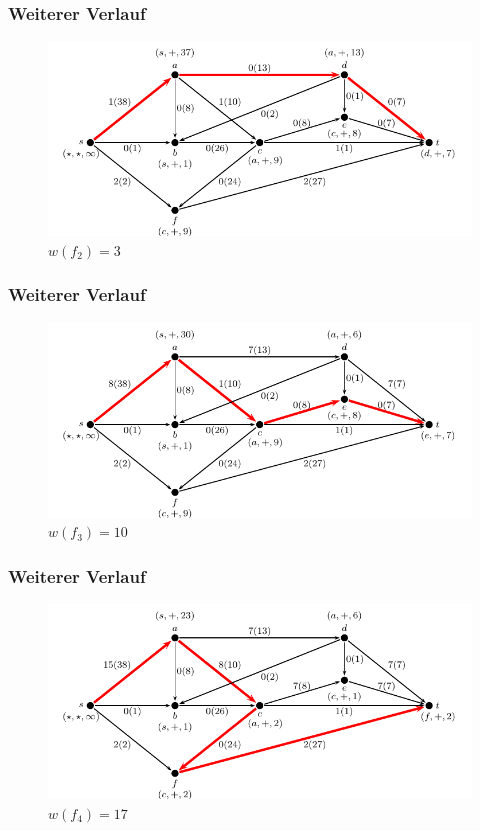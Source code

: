 \documentclass[smaller]{beamer}
\begin{document}
\begin{frame}
 \frametitle{Weiterer Verlauf}
 \begin{center}
  \begin{figure}
   \includegraphics{fig25.pdf}
   \caption{$w(f_2) = 3$}
   \label{abb:9:4}
  \end{figure}
\end{center}
\end{frame}

\begin{frame}
 \frametitle{Weiterer Verlauf}
 \begin{center}
  \begin{figure}
   \includegraphics{fig26.pdf}
   \caption{$w(f_3) = 10$}
   \label{abb:9:5}
  \end{figure}
\end{center}
\end{frame}

\begin{frame}
 \frametitle{Weiterer Verlauf}
 \begin{center}
  \begin{figure}
   \includegraphics{fig27.pdf}
   \caption{$w(f_4) = 17$}
   \label{abb:9:6}
  \end{figure}
\end{center}
\end{frame}
\end{document}
